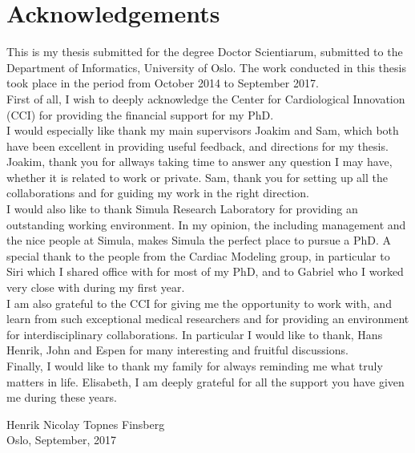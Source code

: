 
\section*{Acknowledgements}

This is my thesis submitted for the degree Doctor Scientiarum,
submitted to the Department of Informatics, University of Oslo. The
work conducted in this thesis took place in the period from October
2014 to September 2017.\\
\indent First of all, I wish to deeply acknowledge the Center for Cardiological
Innovation (CCI) for providing the financial support for my PhD.\\
\indent I would especially like thank my main supervisors Joakim and Sam,
which both have been excellent in providing useful feedback, and
directions for my thesis. Joakim, thank you for allways taking time to
answer any question I may have, whether it is related to work or
private. Sam, thank you for setting up all the collaborations and for
guiding my work in the right direction.\\
\indent I would also like to thank Simula Research Laboratory for providing
an outstanding working environment. In my opinion, the including
management and the nice people at Simula, makes Simula the perfect
place to pursue a PhD. A special thank to the people from the Cardiac
Modeling group, in particular to Siri which I shared office with for most
of my PhD, and to Gabriel who I worked very close with during my first
year. \\
\indent I am also grateful to the CCI for giving me the opportunity to work
with, and learn from such exceptional medical researchers and for
providing an environment for interdisciplinary collaborations. In
particular I would like to thank, Hans Henrik, John and Espen for many
interesting and fruitful discussions. \\
\indent Finally, I would like to thank my family for always reminding me what
truly matters in life. Elisabeth, I am
deeply grateful for all the support you have given me during these years. 

\vspace{5cm}
\noindent
Henrik Nicolay Topnes Finsberg\\
Oslo, September, 2017
      
